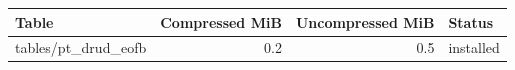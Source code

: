 {\small
\begin{tabular}{lrrl}
\hline
Table & Compressed MiB & Uncompressed MiB & Status \\
\hline
tables/pt\_drud\_eofb & 0.2 & 0.5 & installed \\
\hline
\end{tabular}
}
